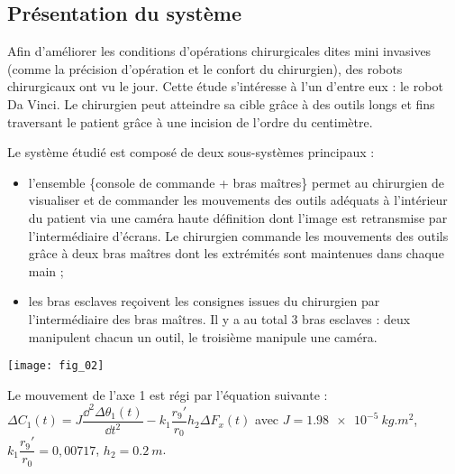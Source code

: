 \normaltrue \difficilefalse \tdifficilefalse
\correctiontrue



\setcounter{question}{0}%
\ifcorrection
\else
{}
\fi




\ifprof
\else
\subsection*{Présentation du système}

Afin d’améliorer les conditions d’opérations chirurgicales dites mini invasives (comme la précision d’opération
et le confort du chirurgien), des robots chirurgicaux ont vu le jour. Cette étude s’intéresse à l’un d’entre eux : le
robot Da Vinci. Le chirurgien peut atteindre sa cible grâce à des outils longs et fins traversant le patient grâce
à une incision de l’ordre du centimètre.


Le système étudié est composé de deux sous-systèmes principaux :
\begin{itemize}
\item l’ensemble \{console de commande + bras maîtres\} permet au chirurgien de visualiser et de commander les
mouvements des outils adéquats à l’intérieur du patient via une caméra haute définition dont l’image est
retransmise par l’intermédiaire d’écrans. Le chirurgien commande les mouvements des outils grâce à deux
bras maîtres dont les extrémités sont maintenues dans chaque main ;
\item les bras esclaves reçoivent les consignes issues du chirurgien par l’intermédiaire des bras maîtres. Il y a au
total 3 bras esclaves : deux manipulent chacun un outil, le troisième manipule une caméra.
\end{itemize}
\begin{marginfigure}
\texttt{[image: fig\_02]}
\end{marginfigure}


Le mouvement de l'axe 1 est régi par l'équation suivante : 
$\Delta C_1(t)=J\dfrac{\dd^2 \Delta \theta_1(t)}{\dd t^2} - k_1 \dfrac{r_9'}{r_0}h_2 \Delta F_x(t)$ avec $J=\SI{1,98e-5}{kg.m^2}$, $k_1\dfrac{r_9'}{r_0}=0,00717$, $h_2=\SI{0,2}{m}$.

